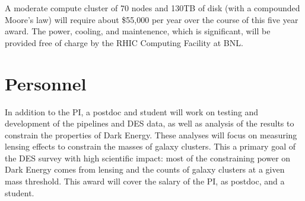 \documentclass[12pt]{article}
\begin{document}
A moderate compute cluster of 70 nodes and 130TB of disk (with a compounded
Moore's law) will require about \$55,000 per year over the course of this
five year award.  The power, cooling, and maintenence, which is significant, will
be provided free of charge by the RHIC Computing Facility at BNL.  

\section{Personnel}

In addition to the PI, a postdoc and student will work on testing and
development of the pipelines and DES data, as well as analysis of the results
to constrain the properties of Dark Energy.  These analyses will focus on
measuring lensing effects to constrain the masses of galaxy clusters.  This a
primary goal of the DES survey with high scientific impact:  most of the
constraining power on Dark Energy comes from lensing and the counts of galaxy
clusters at a given mass threshold.  This award will cover the salary of the
PI, as postdoc, and a student.
\end{document}
